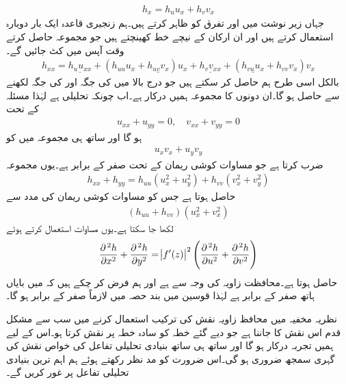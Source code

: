 \begin{align*}
h_x=h_uu_x+h_vv_x
\end{align*}
جہاں زیر نوشت میں  اور  تفرق کو ظاہر کرتے ہیں۔ہم زنجیری قاعدہ ایک بار دوبارہ استعمال کرتے ہیں اور ان ارکان کے نیچے خط کھینچتے ہیں جو  مجموعہ حاصل کرتے وقت آپس میں کٹ جائیں گے۔
\begin{align*}
h_{xx}=\underline{h_uu_{xx}}+(h_{uu}u_x+\underline{h_{uv}v_x})u_x+\underline{h_vv_{xx}}+(\underline{h_{vu}u_x}+h_{vv}v_x)v_x
\end{align*}
بالکل اسی طرح ہم  حاصل کر سکتے ہیں جو درج بالا میں  کی جگہ  اور  کی جگہ  لکھنے سے حاصل ہو گا۔ان دونوں کا مجموعہ  ہمیں درکار ہے۔اب چونکہ  تحلیلی ہے لہٰذا مسئلہ  کے تحت 
\begin{align*}
u_{xx}+u_{yy}=0,\quad v_{xx}+v_{yy}=0
\end{align*}
ہو گا اور ساتھ ہی مجموعہ میں  کو 
\begin{align*}
u_xv_x+u_yv_y
\end{align*}
ضرب کرتا ہے جو مساوات کوشی ریمان کے تحت صفر کے برابر ہے۔یوں مجموعہ
\begin{align*}
h_{xx}+h_{yy}=h_{uu}(u_x^2+u_y^2)+h_{vv}(v_x^2+v_y^2)
\end{align*}
حاصل ہوتا ہے جس کو مساوات کوشی ریمان کی مدد سے
\begin{align*}
(h_{uu}+h_{vv})(u_x^2+v_x^2)
\end{align*}
لکھا جا سکتا ہے۔یوں مساوات  استعمال کرتے ہوئے
\begin{align}
\frac{\partial^{\,2}h}{\partial x^2}+\frac{\partial^{\,2}h}{\partial y^2}=\abs{f'(z)}^2\left(\frac{\partial^{\,2}h}{\partial u^2}+\frac{\partial^{\,2}h}{\partial v^2}\right)
\end{align}
حاصل ہوتا ہے۔محافظت زاویہ کی وجہ سے  ہے اور ہم فرض کر چکے ہیں کہ  میں بایاں ہاتھ صفر کے برابر ہے لہٰذا قوسین میں بند حصہ  میں لازماً صفر کے برابر ہو گا۔  

نظریہ مخفیہ میں محافظ زاویہ نقش کی ترکیب استعمال کرنے میں سب سے مشکل قدم اس نقش کا جاننا ہے  جو دیے گئے خطہ کو سادہ خطہ پر نقش کرتا ہو۔اس کے لیے ہمیں تجربہ درکار ہو گا اور ساتھ ہی ساتھ بنیادی تحلیلی تفاعل کی خواص نقش کی گہری  سمجھ ضروری ہو گی۔اس ضرورت کو مد نظر رکھتے ہوئے ہم اہم ترین بنیادی تحلیلی تفاعل پر غور کریں گے۔


